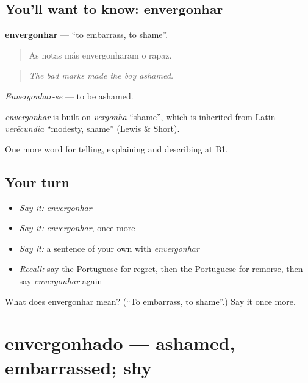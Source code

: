 \subsection*{You'll want to know: envergonhar}
\textbf{envergonhar} — \textquotedblleft{}to embarrass, to shame\textquotedblright{}.

\begin{quote}
As notas más envergonharam o rapaz.
\end{quote}

\begin{quote}
\emph{The bad marks made the boy ashamed.}
\end{quote}

\emph{Envergonhar-se} — to be ashamed.

\begin{cousinweb}
\emph{envergonhar} is built on \emph{vergonha} \textquotedblleft{}shame\textquotedblright{}, which is inherited from Latin \emph{verēcundia} \textquotedblleft{}modesty, shame\textquotedblright{} (Lewis \& Short).
\end{cousinweb}

\begin{grammarlens}[title={What you've built}]
One more word for telling, explaining and describing at B1.
\end{grammarlens}

\subsection*{Your turn}
\begin{itemize}
\raggedright
  \item \emph{Say it:} \emph{envergonhar}
  \item \emph{Say it:} \emph{envergonhar}, once more
  \item \emph{Say it:} a sentence of your own with \emph{envergonhar}
  \item \emph{Recall:} say the Portuguese for regret, then the Portuguese for remorse, then say \emph{envergonhar} again
\end{itemize}

\begin{tcolorbox}[breakable,colback=teal!4,colframe=teal!35!black,title={Before you move on}]
What does envergonhar mean? (\textquotedblleft{}To embarrass, to shame\textquotedblright{}.) Say it once more.
\end{tcolorbox}
\section[envergonhado]{envergonhado — ashamed, embarrassed; shy}

